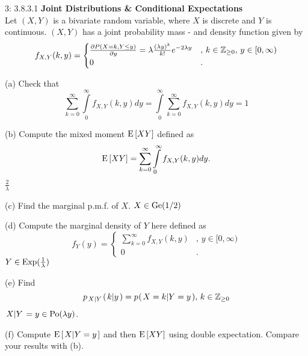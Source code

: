\documentclass[a4paper,twoside=false,abstract=false,numbers=noenddot,
titlepage=false,headings=small,parskip=half,version=last]{scrartcl}
\begin{document}
\begin{exercise}{3: 3.8.3.1}
    \textbf{Joint Distributions \& Conditional Expectations} \\
    Let $(X, Y)$ is a bivariate random variable, where $X$ is discrete and $Y$
    is continuous. $(X, Y)$ has a joint probability mass - and density function
    given by
    \begin{equation}
        f_{X,Y}(k, y) = \begin{cases}
            \frac{\partial{P(X=k, Y\le y)}}{\partial{y}} =
            \lambda\frac{(\lambda y)^k}{k!}e^{-2\lambda y}
                    &,\, k\in\mathbb{Z}_{\ge 0},\, y\in [0, \infty) \\
            0       &.
        \end{cases}
    \end{equation}

    (a) Check that
    \begin{equation}
        \sum\limits_{k=0}^\infty \int\limits_0^\infty f_{X,Y}(k,y)dy =
        \int\limits_0^\infty \sum\limits_{k=0}^\infty f_{X,Y}(k,y)dy = 1
    \end{equation}

    (b) Compute the mixed moment ${\rm E}\,[XY]$ defined as
    \begin{equation}
        {\rm E}\,[XY] =
        \sum\limits_{k=0}^\infty \int\limits_0^\infty f_{X,Y}(k,y)dy.
    \end{equation}
    \Answer $\frac{2}{\lambda}$

    (c) Find the marginal p.m.f. of $X$.
    \Answer $X\in\text{Ge}(1/2)$

    (d) Compute the marginal density of $Y$ here defined as
    \begin{equation}
        f_Y(y) = \begin{cases}
            \sum\limits_{k=0}^\infty f_{X,Y}(k,y) &, \, y\in[0,\infty) \\
             0                                    &.
        \end{cases}
    \end{equation}
    \Answer $Y\in\text{Exp}(\frac{1}{\lambda})$

    (e) Find
    \begin{equation}
        p_{\left. X \middle\vert Y \right.} (\left. k \middle\vert y \right.) =
        p_{} (\left. X=k \middle\vert Y=y \right.), \, k\in\mathbb{Z}_{\ge 0}
    \end{equation}
    \Answer $\left. X \middle\vert Y \right. = y\in\text{Po}(\lambda y)$.

    (f) Compute ${\rm E}\,[\left. X \middle\vert Y=y \right.]$ and then ${\rm E}\,[XY]$ using
    double expectation. Compare your results with (b).
\end{exercise}
\begin{solution}
\end{solution}
\pagebreak
\end{document}
